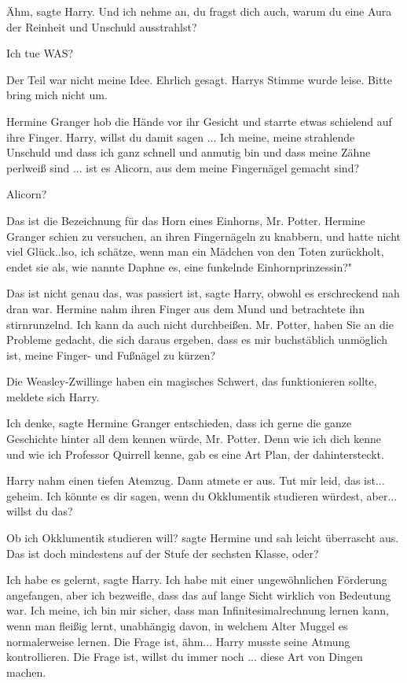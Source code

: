 \glqq{}Ähm\grqq{}, sagte Harry. \glqq{}Und ich nehme an, du fragst dich auch,
warum du eine Aura der Reinheit und Unschuld ausstrahlst?\grqq{}

\glqq{}Ich tue WAS?\grqq{}

\glqq{}Der Teil war nicht meine Idee. Ehrlich gesagt.\grqq{} Harrys Stimme wurde
leise. \glqq{}Bitte bring mich nicht um.\grqq{}

Hermine Granger hob die Hände vor ihr Gesicht und starrte etwas schielend auf
ihre Finger. \glqq{}Harry, willst du damit sagen ... Ich meine, meine strahlende
Unschuld und dass ich ganz schnell und anmutig bin und dass meine Zähne perlweiß
sind ... ist es Alicorn, aus dem meine Fingernägel gemacht sind?\grqq{}

\glqq{}Alicorn?\grqq{}

\glqq{}Das ist die Bezeichnung für das Horn eines Einhorns, Mr. Potter.\grqq{}
Hermine Granger schien zu versuchen, an ihren Fingernägeln zu knabbern, und
hatte nicht viel Glück.\grqq{}.lso, ich schätze, wenn man ein Mädchen von den
Toten zurückholt, endet sie als, wie nannte Daphne es, eine funkelnde
Einhornprinzessin?"

\glqq{}Das ist nicht genau das, was passiert ist\grqq{}, sagte Harry, obwohl es
erschreckend nah dran war. Hermine nahm ihren Finger aus dem Mund und
betrachtete ihn stirnrunzelnd. \glqq{}Ich kann da auch nicht durchbeißen. Mr.
Potter, haben Sie an die Probleme gedacht, die sich daraus ergeben, dass es mir
buchstäblich unmöglich ist, meine Finger- und Fußnägel zu kürzen?\grqq{}

\glqq{}Die Weasley-Zwillinge haben ein magisches Schwert, das funktionieren
sollte\grqq{}, meldete sich Harry.

\glqq{}Ich denke\grqq{}, sagte Hermine Granger entschieden, \glqq{}dass ich gerne
die ganze Geschichte hinter all dem kennen würde, Mr. Potter. Denn wie ich dich
kenne und wie ich Professor Quirrell kenne, gab es eine Art Plan, der
dahintersteckt.\grqq{}

Harry nahm einen tiefen Atemzug. Dann atmete er aus. \glqq{}Tut mir leid, das
ist... geheim. Ich könnte es dir sagen, wenn du Okklumentik studieren würdest,
aber... willst du das?\grqq{}

\glqq{}Ob ich Okklumentik studieren will?\grqq{} sagte Hermine und sah leicht
überrascht aus. \glqq{}Das ist doch mindestens auf der Stufe der sechsten Klasse,
oder?\grqq{}

\glqq{}Ich habe es gelernt\grqq{}, sagte Harry. \glqq{}Ich habe mit einer
ungewöhnlichen Förderung angefangen, aber ich bezweifle, dass das auf lange
Sicht wirklich von Bedeutung war. Ich meine, ich bin mir sicher, dass man
Infinitesimalrechnung lernen kann, wenn man fleißig lernt, unabhängig davon, in
welchem Alter Muggel es normalerweise lernen. Die Frage ist, ähm...\grqq{} Harry
musste seine Atmung kontrollieren. \glqq{}Die Frage ist, willst du immer noch ...
diese Art von Dingen machen.\grqq{}

